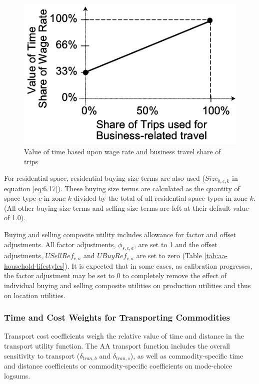 \begin{figure}
\centering
\includegraphics[scale=0.75]{aa/aa-value-of-time}
\caption{Value of time based upon wage rate and business travel share of trips}
\label{fig:aa-vot}
\end{figure}

For residential space, residential buying size terms are also used ($Size_{b,c,k}$ in equation \ref{eq:6.17}). These buying size terms are calculated as the quantity of space type $c$ in zone $k$ divided by the total of all residential space types in zone $k$. (All other buying size terms and selling size terms are left at their default value of 1.0).

Buying and selling composite utility includes allowance for factor and offset adjustments. All factor adjustments, $\phi_{s,c,a}$, are set to 1 and the offset adjustments, $USellRef_{c,a}$ and $UBuyRef_{c,a}$ are set to zero (Table \ref{tab:aa-household-lifestyles}). It is expected that in some cases, as calibration progresses, the factor adjustment may be set to 0 to completely remove the effect of individual buying and selling composite utilities on production utilities and thus on location utilities.

\subsubsection{Time and Cost Weights for Transporting Commodities}
Transport cost coefficients weigh the relative value of time and distance in the transport utility function. The AA transport function includes the overall sensitivity to transport ($\delta_{tran,b}$ and $\delta_{tran,s}$), as well as commodity-specific time and distance coefficients or commodity-specific coefficients on mode-choice logsums. 

